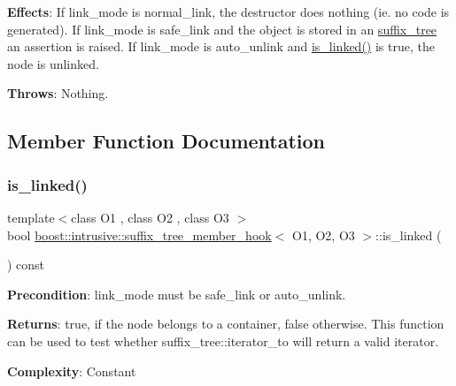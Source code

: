 {\bfseries Effects}\+: If link\+\_\+mode is {\ttfamily normal\+\_\+link}, the destructor does nothing (ie. no code is generated). If link\+\_\+mode is {\ttfamily safe\+\_\+link} and the object is stored in an \hyperlink{classboost_1_1intrusive_1_1suffix__tree}{suffix\+\_\+tree} an assertion is raised. If link\+\_\+mode is {\ttfamily auto\+\_\+unlink} and {\ttfamily \hyperlink{classboost_1_1intrusive_1_1suffix__tree__member__hook_ae37983c6aa54b43839bccb8b97dec516}{is\+\_\+linked()}} is true, the node is unlinked.

{\bfseries Throws}\+: Nothing. 

\subsection{Member Function Documentation}
\mbox{\label{classboost_1_1intrusive_1_1suffix__tree__member__hook_ae37983c6aa54b43839bccb8b97dec516}} 
\subsubsection{\texorpdfstring{is\+\_\+linked()}{is\_linked()}}
{\footnotesize\ttfamily template$<$class O1 , class O2 , class O3 $>$ \\
bool \hyperlink{classboost_1_1intrusive_1_1suffix__tree__member__hook}{boost\+::intrusive\+::suffix\+\_\+tree\+\_\+member\+\_\+hook}$<$ O1, O2, O3 $>$\+::is\+\_\+linked (\begin{DoxyParamCaption}{ }\end{DoxyParamCaption}) const}

{\bfseries Precondition}\+: link\+\_\+mode must be {\ttfamily safe\+\_\+link} or {\ttfamily auto\+\_\+unlink}.

{\bfseries Returns}\+: true, if the node belongs to a container, false otherwise. This function can be used to test whether {\ttfamily suffix\+\_\+tree\+::iterator\+\_\+to} will return a valid iterator.

{\bfseries Complexity}\+: Constant \mbox{\label{classboost_1_1intrusive_1_1suffix__tree__member__hook_a94b9cfe8b749b69dfb56c28adf0e477d}} 
